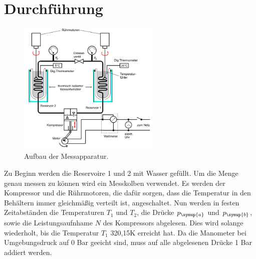\section{Durchführung}
\label{sec:Durchführung}
\begin{figure}
  \centering
  \includegraphics[width=0.60\textwidth]{messapparatur.png}
  \caption{Aufbau der Messapparatur\cite{sample}.}
  \label{fig:aufbau}
\end{figure}
Zu Beginn werden die Reservoire 1 und 2 mit Wasser gefüllt. Um die Menge genau
messen zu können wird ein Messkolben verwendet.
Es werden der Kompressor und die Rührmotoren, die dafür sorgen, dass die Temperatur in
den Behältern immer gleichmäßig verteilt ist, angeschaltet.
Nun werden in festen Zeitabständen die Temperaturen $T_1$ und $T_2$, die Drücke
$p_\symup{a}$ und $p_\symup{b}$, sowie die Leistungsaufnhame $N$ des Kompressors
abgelesen. Dies wird solange wiederholt, bis die Temperatur $T_1$ 320,15\si{\kelvin}
erreicht hat. Da die Manometer bei Umgebungsdruck auf 0 Bar geeicht sind,
muss auf alle abgelesenen Drücke 1 Bar addiert werden.
